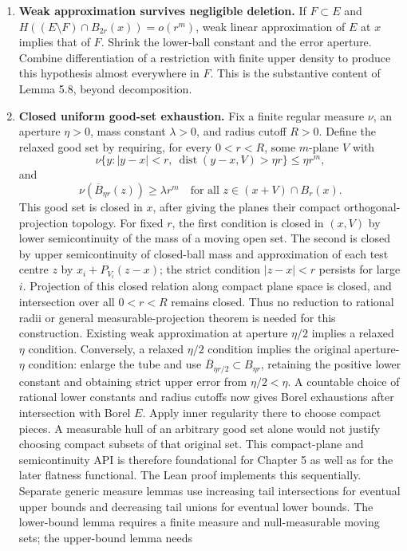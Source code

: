 \begin{enumerate}
\item \textbf{Weak approximation survives negligible deletion.}
If $F\subset E$ and $H((E\setminus F)\cap B_{2r}(x))=o(r^m)$, weak linear
approximation of $E$ at $x$ implies that of $F$. Shrink the lower-ball
constant and the error aperture. Combine differentiation of a restriction
with finite upper density to produce this hypothesis almost everywhere in $F$.
This is the substantive content of Lemma 5.8, beyond decomposition.

\item \textbf{Closed uniform good-set exhaustion.}
Fix a finite regular measure $\nu$, an aperture $\eta>0$, mass constant
$\lambda>0$, and radius cutoff $R>0$. Define the relaxed good set by requiring,
for every $0<r<R$, some $m$-plane $V$ with
\[
\nu\{y:|y-x|<r,\ \operatorname{dist}(y-x,V)>\eta r\}
\leq\eta r^m,
\]
and
\[
\nu(\overline B_{\eta r}(z))\geq\lambda r^m
\quad\text{for all }z\in(x+V)\cap B_r(x).
\]
This good set is closed in $x$, after giving the planes their compact
orthogonal-projection topology. For fixed $r$, the first condition is closed
in $(x,V)$ by lower semicontinuity of the mass of a moving open set. The
second is closed by upper semicontinuity of closed-ball mass and approximation
of each test centre $z$ by $x_i+P_{V_i}(z-x)$; the strict condition $|z-x|<r$
persists for large $i$. Projection of this closed relation along compact
plane space is closed, and intersection over all $0<r<R$ remains closed.
Thus no reduction to rational radii or general measurable-projection theorem
is needed for this construction. Existing weak approximation at aperture
$\eta/2$ implies a relaxed $\eta$ condition. Conversely, a relaxed
$\eta/2$ condition implies the original aperture-$\eta$ condition: enlarge
the tube and use $\overline B_{\eta r/2}\subset B_{\eta r}$, retaining the
positive lower constant and obtaining strict upper error from $\eta/2<\eta$.
A countable choice of rational lower constants and radius cutoffs now gives
Borel exhaustions after intersection with Borel $E$. Apply inner regularity
there to choose compact pieces. A measurable hull of an arbitrary good set
alone would not justify choosing compact subsets of that original set.
This compact-plane and semicontinuity API is therefore foundational for
Chapter 5 as well as for the later flatness functional.
The Lean proof implements this sequentially. Separate generic measure lemmas
use increasing tail intersections for eventual upper bounds and decreasing
tail unions for eventual lower bounds. The lower-bound lemma requires a
finite measure and null-measurable moving sets; the upper-bound lemma needs

\end{enumerate}
